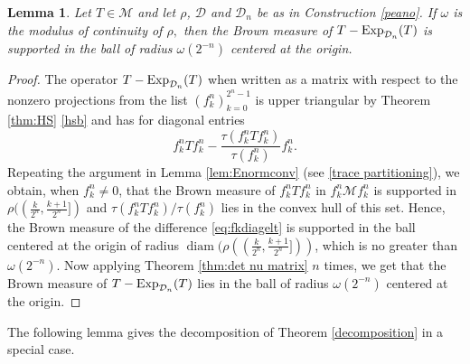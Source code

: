 \documentclass{amsart}
\theoremstyle{plain}
\newtheorem{lem}[thm]{Lemma}
\theoremstyle{remark}
\begin{document}
\begin{lem}\label{brown small bound} Let $T\in\mathcal{M}$ and let $\rho$, $\mathcal{D}$ and $\mathcal{D}_n$ be as in Construction \ref{peano}.
If $\omega$ is the modulus of continuity of $\rho,$ then the Brown measure of $T-{\rm Exp}_{\mathcal{D}_n}(T)$ is supported in the ball of radius $\omega(2^{-n})$ centered
at the origin.
\end{lem}
\begin{proof} The operator $T-{\rm Exp}_{\mathcal{D}_n}(T)$ when written as a matrix with respect to the nonzero projections from the list $(f^n_k)_{k=0}^{2^n-1}$ is upper triangular by Theorem \ref{thm:HS} \eqref{hsb} and has for diagonal entries
\begin{equation}\label{eq:fkdiagelt}
f^n_kTf^n_k-\frac{\tau(f^n_kTf^n_k)}{\tau(f^n_k)}f^n_k.
\end{equation}
Repeating the argument in Lemma \ref{lem:Enormconv} (see \eqref{trace partitioning}), we obtain, when $f^n_k\ne0$, that the Brown measure of $f^n_kTf^n_k$ in $f^n_k\mathcal{M}f^n_k$ is supported in
$\rho((\frac{k}{2^n},\frac{k+1}{2^n}])$ and $\tau(f^n_kTf^n_k)/\tau(f^n_k)$ lies in the convex hull of this set. Hence, the Brown measure of the difference \eqref{eq:fkdiagelt} is supported in the ball centered at the origin of radius $\operatorname{diam}(\rho((\frac{k}{2^n},\frac {k+1}{2^n}]))$, which is no greater than $\omega(2^{-n}).$ Now applying Theorem \ref{thm:det nu matrix} $n$ times, we get that the Brown measure of $T-{\rm Exp}_{\mathcal{D}_n}(T)$ lies in
the ball of radius $\omega(2^{-n})$ centered at the origin.
\end{proof}

The following lemma gives the decomposition of Theorem \ref{decomposition} in a special case.
\end{document}

